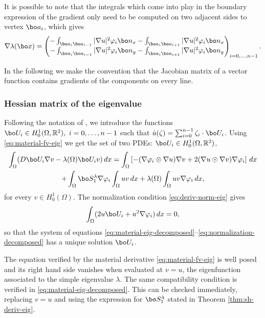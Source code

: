 \begin{rem}
It is possible to note that the integrals which come into play in the boundary expression of the gradient only need to be computed on two adjacent sides to vertex $\bo a_i$, which gives
\[
\nabla \lambda (\bo x) = \begin{pmatrix}
-\int_{\bo a_{i}\bo a_{i-1}}|\nabla u|^2\varphi_i \bo n_x-\int_{\bo a_{i}\bo a_{i+1}}|\nabla u|^2\varphi_i \bo n_x\\
-\int_{\bo a_{i}\bo a_{i-1}}|\nabla u|^2\varphi_i \bo n_y-\int_{\bo a_{i}\bo a_{i+1}}|\nabla u|^2\varphi_i \bo n_y
\end{pmatrix}_{i=0,\dots,n-1}.
\]
\label{rem:grad-explicit}
\end{rem}

In the following we make the convention that the Jacobian matrix of a vector function contains gradients of the components on every line.

\subsubsection*{Hessian matrix of the eigenvalue} Following the notation of \cite{laurain2ndDeriv}, we introduce the functions $\bo U_i \in H_0^1(\Omega,\Bbb{R}^2),\ i=0,\dots,n-1$ such that $\dot u(\zeta) = \sum_{i=0}^{n-1} \zeta_i \cdot \bo U_i$. Using \eqref{eq:material-fv-eig} we get the set of two PDEs: $\bo U_i \in H_0^1(\Omega,\Bbb{R}^2)$,
\vspace*{-5pt}
\begin{multline}\label{eq:material-eig-decomposed}
\int_\Omega (D \bo U_i \nabla v-\lambda(\Omega) \bo U_iv) \, dx = \int_\Omega \left[-(\nabla \varphi_i\otimes \nabla u)\nabla v+2(\nabla u \odot \nabla v)\nabla \varphi_i\right] \, dx\\
+\int_\Omega \bo S_1^\lambda \nabla \varphi_i \int_\Omega uv\, dx + \lambda(\Omega) \int_\Omega uv \nabla \varphi_i\, dx,
\end{multline}
for every $v\in H_0^1(\Omega)$. The normalization condition \eqref{eq:deriv-norm-eig} gives
\begin{equation}
\int_\Omega (2u \bo U_i + u^2 \nabla \varphi_i)\, dx = 0,
\label{eq:normalization-decomposed}
\end{equation}
so that the system of equations \eqref{eq:material-eig-decomposed}--\eqref{eq:normalization-decomposed} has a unique solution $\bo U_i$.

The equation verified by the material derivative \eqref{eq:material-fv-eig} is well posed and its right hand side vanishes when evaluated at $v=u$, the eigenfunction associated to the simple eigenvalue $\lambda$. The same compatibility condition is verified in \eqref{eq:material-eig-decomposed}. This can be checked immediately, replacing $v=u$ and using the expression for $\bo S_1^\lambda$ stated in Theorem \ref{thm:sh-deriv-eig}.

